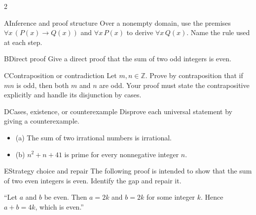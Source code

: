 \documentclass[9pt]{extarticle}
\begin{document}
\begin{multicols}{2}
\begin{CoreProblem}{A}{Inference and proof structure}
Over a nonempty domain, use the premises
$\forall x\,(P(x)\to Q(x))$ and $\forall x\,P(x)$ to derive
$\forall x\,Q(x)$. Name the rule used at each step.
\end{CoreProblem}
\begin{CoreProblem}{B}{Direct proof}
Give a direct proof that the sum of two odd integers is even.
\end{CoreProblem}
\begin{CoreProblem}{C}{Contraposition or contradiction}
Let $m,n\in\mathbb Z$. Prove by contraposition that if $mn$ is odd, then both
$m$ and $n$ are odd. Your proof must state the contrapositive explicitly and
handle its disjunction by cases.
\end{CoreProblem}
\columnbreak
\begin{CoreProblem}{D}{Cases, existence, or counterexample}
Disprove each universal statement by giving a counterexample.
\begin{itemize}
  \item (a) The sum of two irrational numbers is irrational.
  \item (b) $n^2+n+41$ is prime for every nonnegative integer $n$.
\end{itemize}
\end{CoreProblem}
\begin{CoreProblem}{E}{Strategy choice and repair}
The following proof is intended to show that the sum of two even integers is even. Identify the gap and repair it.

``Let $a$ and $b$ be even. Then $a=2k$ and $b=2k$ for some integer $k$. Hence $a+b=4k$, which is even.''
\end{CoreProblem}
\end{multicols}
\CoreWorkArea
\end{document}
